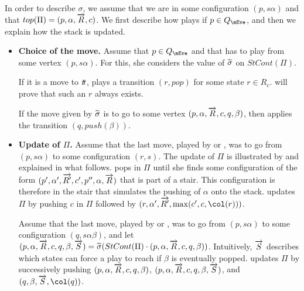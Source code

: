 In order to describe $\sigma$, we assume that we are in some
configuration $(p,s\alpha)$ and that
$top(\Pi)=(p,\alpha,\overrightarrow{R},c)$. We first
describe how \Eve plays if $p\in Q_\mEve$, and then we explain how
the stack is updated.

\begin{itemize}
\item \textbf{Choice of the move.} Assume that $p\in Q_\mEve$ and
that \Eve has to play from some vertex $(p,s\alpha)$. For
this, she considers the value of $\widetilde{\sigma}$ on $StCont(\Pi)$.

If it is a move to $t\! t$, \Eve plays a transition
$(r,pop)$ for some state $r\in R_c$.  will prove that such
an $r$ always exists.


If the move given by $\widetilde{\sigma}$ is to go to some vertex
$(p,\alpha,\overrightarrow{R},c,q,\beta)$, then \Eve applies
the transition $(q,push(\beta))$.

\item \textbf{Update of $\Pi$.} Assume that the last move,
played by \Eve or \Adam, was to go from $(p,s\alpha)$ to some
configuration $(r,s)$. The update of $\Pi$ is illustrated
by  and
explained in what follows. \Eve pops in $\Pi$ until she finds
some configuration of the form
$(p',\alpha',\overrightarrow{R'},c',p'',\alpha,\overrightarrow{R})$
that is part of a stair. This
configuration is therefore in the stair that simulates the pushing
of $\alpha$ onto the stack. \Eve updates $\Pi$ by pushing
$c$ in $\Pi$ followed by
$(r,\alpha',\vect{R'},\max(c',c,\pdscol{r}))$.


Assume that the last move, played by \Eve or \Adam, was to go from
$(p,s\alpha)$ to some configuration $(q,s\alpha\beta)$, and let
$(p,\alpha,\overrightarrow{R},c,q,\beta,\overrightarrow{S})=\widetilde{\sigma}(StCont(\Pi)\cdot(p,\alpha,\overrightarrow{R},c,q,\beta))$.
Intuitively, $\overrightarrow{S}$ describes which states \Eve can force a play to
reach if $\beta$ is eventually popped. \Eve updates $\Pi$ by
successively pushing
$(p,\alpha,\overrightarrow{R},c,q,\beta)$,
$(p,\alpha,\overrightarrow{R},c,q,\beta,\overrightarrow{S})$, and
$(q,\beta,\vect{S},\pdscol{q})$.
\end{itemize}

